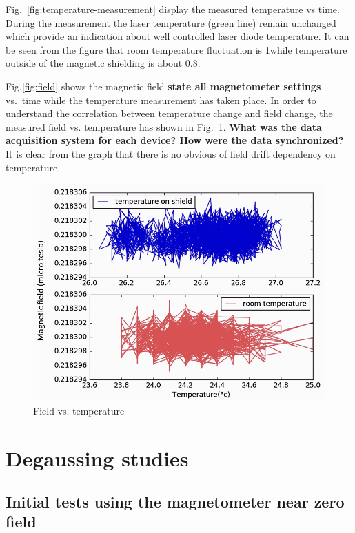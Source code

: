 Fig.~\ref{fig:temperature-measurement} display the measured
temperature vs time.  During the measurement the laser temperature
(green line) remain unchanged which provide an indication about well
controlled laser diode temperature.  It can be seen from the figure
that room temperature fluctuation is 1\degree while temperature
outside of the magnetic shielding is about 0.8\degree.
 
Fig.\ref{fig:field} shows the magnetic field {\bf state all
  magnetometer settings} vs.~time while the temperature measurement
has taken place. In order to understand the correlation between
temperature change and field change, the measured field
vs. temperature has shown in Fig.~\ref{fig:field_vs_temp}. {\bf What
  was the data acquisition system for each device?  How were the data
  synchronized?%
  }  It is clear from the graph that there is no obvious
of field drift dependency on temperature.
  
\begin{figure}%
\centering\includegraphics[width=0.6\linewidth]{figures/field_vs_temp.png}
\caption{Field vs. temperature\label{fig:field_vs_temp}}
\end{figure}
 
   
\section{Degaussing studies\label{sec:degaussing}}

\subsection{Initial tests using the magnetometer near zero field}

